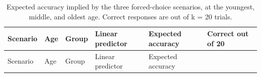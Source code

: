 \documentclass[
  man,
  floatsintext,
  longtable,
  nolmodern,
  notxfonts,
  notimes,
  colorlinks=true,linkcolor=blue,citecolor=blue,urlcolor=blue]{apa7}
\begin{document}
\begin{longtable}[]{@{}
  >{\raggedright\arraybackslash}p{}
  >{\raggedright\arraybackslash}p{}
  >{\raggedright\arraybackslash}p{}
  >{\raggedright\arraybackslash}p{}
  >{\raggedright\arraybackslash}p{}
  >{\raggedright\arraybackslash}p{}@{}}
\caption{Expected accuracy implied by the three forced-choice scenarios,
at the youngest, middle, and oldest age. Correct responses are out of k
= 20 trials.}\label{tbl-scenario-forced-choice}\tabularnewline
\toprule\noalign{}
\begin{minipage}[b]{\linewidth}\raggedright
Scenario
\end{minipage} & \begin{minipage}[b]{\linewidth}\raggedright
Age
\end{minipage} & \begin{minipage}[b]{\linewidth}\raggedright
Group
\end{minipage} & \begin{minipage}[b]{\linewidth}\raggedright
Linear predictor
\end{minipage} & \begin{minipage}[b]{\linewidth}\raggedright
Expected accuracy
\end{minipage} & \begin{minipage}[b]{\linewidth}\raggedright
Correct out of 20
\end{minipage} \\
\midrule\noalign{}
\endfirsthead
\toprule\noalign{}
\begin{minipage}[b]{\linewidth}\raggedright
Scenario
\end{minipage} & \begin{minipage}[b]{\linewidth}\raggedright
Age
\end{minipage} & \begin{minipage}[b]{\linewidth}\raggedright
Group
\end{minipage} & \begin{minipage}[b]{\linewidth}\raggedright
Linear predictor
\end{minipage} & \begin{minipage}[b]{\linewidth}\raggedright
Expected accuracy
\end{minipage} & \begin{minipage}[b]{\linewidth}\raggedright

\end{minipage}
\end{longtable}
\end{document}
